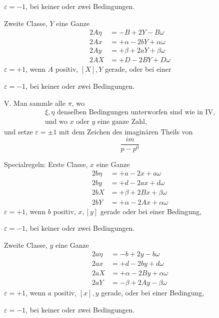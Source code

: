 $\varepsilon=-1$, bei keiner oder zwei Bedingungen.

Zweite Classe, $Y$ eine Ganze
\[
\begin{aligned}
2A\eta&=-B+2Y-B\omega\\
2Ax&=+\alpha-2bY+\alpha\omega\\
2Ay&=+\beta+2aY+\beta\omega\\
2AX&=+D-2BY+D\omega
\end{aligned}
\]
\noindent $\varepsilon=+1$, wenn $A$ positiv, $[X],Y$ gerade, oder bei einer\par
\noindent $\varepsilon=-1$, bei keiner oder zwei Bedingungen.

V. Man sammle alle $\pi$, wo
\[
\begin{gathered}
\xi,\eta\text{ denselben Bedingungen unterworfen sind wie in IV,}\\
\text{und wo }x\text{ oder }y\text{ eine ganze Zahl,}
\end{gathered}
\]
und setze $\varepsilon=\pm1$ mit dem Zeichen des imaginären Theils von
\[
\frac{im}{p-p^0}
\]

Specialregeln: Erste Classe, $x$ eine Ganze
\[
\begin{aligned}
2b\eta&=+a-2x+a\omega\\
2by&=+d-2ax+d\omega\\
2bX&=+\beta+2Bx+\beta\omega\\
2bY&=+\alpha-2Ax+\alpha\omega
\end{aligned}
\]
\noindent $\varepsilon=+1$, wenn $b$ positiv, $x,[y]$ gerade oder bei einer Bedingung,\par
\noindent $\varepsilon=-1$, bei keiner oder zwei Bedingungen.

Zweite Classe, $y$ eine Ganze
\[
\begin{aligned}
2a\eta&=-b+2y-b\omega\\
2ax&=+d-2by+d\omega\\
2aX&=+\alpha-2By+\alpha\omega\\
2aY&=-\beta+2Ay-\beta\omega
\end{aligned}
\]
\noindent $\varepsilon=+1$, wenn $a$ positiv, $[x],y$ gerade, oder bei einer Bedingung,\par
\noindent $\varepsilon=-1$, bei keiner oder zwei Bedingungen.
